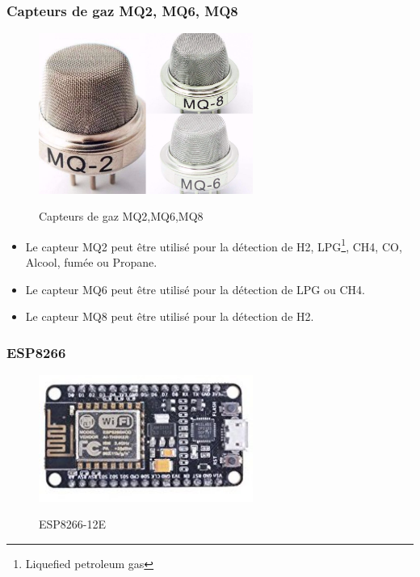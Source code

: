 \subsubsection{Capteurs de gaz MQ2, MQ6, MQ8}

\begin{figure}[H]
  \centering
  \href{http://playground.arduino.cc/Main/MQGasSensors}{
  \includegraphics[width=7cm]{image/mq.png}
  }
  \caption{Capteurs de gaz MQ2,MQ6,MQ8}
\end{figure}

\begin{itemize}
\item Le capteur MQ2 peut être utilisé pour la détection de H2, LPG\footnote{Liquefied petroleum gas}, CH4, CO, Alcool, fumée ou Propane. 
\item Le capteur MQ6 peut être utilisé pour la détection de LPG ou CH4. 
\item Le capteur MQ8 peut être utilisé pour la détection de H2.

\end{itemize}


\subsubsection{ESP8266}

\begin{figure}[H]
  \centering
  \href{https://fr.wikipedia.org/wiki/ESP8266}{
  \includegraphics[width=7cm]{image/esp8266.png}
  }
  \caption{ESP8266-12E}
\end{figure}

